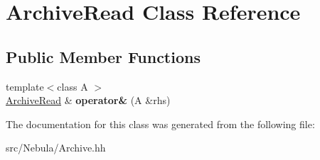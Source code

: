 \hypertarget{classArchiveRead}{\section{\-Archive\-Read \-Class \-Reference}
\label{classArchiveRead}
}
\subsection*{\-Public \-Member \-Functions}
\begin{DoxyCompactItemize}
\item 
\hypertarget{classArchiveRead_a776e35b241a26430d288a674454f032a}{{\footnotesize template$<$class A $>$ }\\\hyperlink{classArchiveRead}{\-Archive\-Read} \& {\bfseries operator\&} (\-A \&rhs)}\label{classArchiveRead_a776e35b241a26430d288a674454f032a}

\end{DoxyCompactItemize}


\-The documentation for this class was generated from the following file\-:\begin{DoxyCompactItemize}
\item 
src/\-Nebula/\-Archive.\-hh\end{DoxyCompactItemize}
